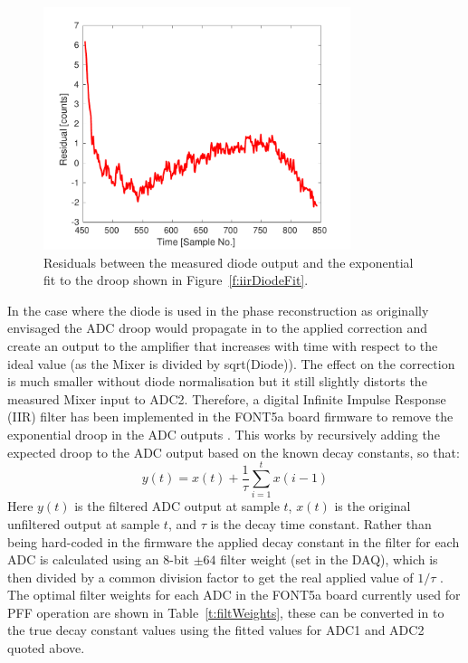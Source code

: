 \begin{figure}
  \centering
  \includegraphics[width=0.8\textwidth]{Figures/commissioning/iirDiodeFitResid}
  \caption{Residuals between the measured diode output and the exponential fit to the droop shown in Figure~\ref{f:iirDiodeFit}.}
  \label{f:iirDiodeFitResid}
\end{figure}

In the case where the diode is used in the phase reconstruction as originally envisaged the ADC droop would propagate in to the applied correction and create an output to the amplifier that increases with time with respect to the ideal value (as the Mixer is divided by sqrt(Diode)). The effect on the correction is much smaller without diode normalisation but it still slightly distorts the measured Mixer input to ADC2. Therefore, a digital Infinite Impulse Response (IIR) filter has been implemented in the FONT5a board firmware to remove the exponential droop in the ADC outputs \cite{glennCLIC14}. This works by recursively adding the expected droop to the ADC output based on the known decay constants, so that:
\begin{equation}
y(t) = x(t) + \frac{1}{\tau} \sum_{i=1}^{t} x(i-1)
\end{equation}
\label{e:iirFilt}
Here \(y(t)\) is the filtered ADC output at sample \(t\), \(x(t)\) is the original unfiltered output at sample \(t\), and \(\tau\) is the decay time constant. Rather than being hard-coded in the firmware the applied decay constant in the filter for each ADC is calculated using an 8-bit \(\pm64\) filter weight (set in the DAQ), which is then divided by a common division factor to get the real applied value of \(1/\tau\) \cite{glennPriv}. The optimal filter weights for each ADC in the FONT5a board currently used for PFF operation are shown in Table~\ref{t:filtWeights}, these can be converted in to the true decay constant values using the fitted values for ADC1 and ADC2 quoted above.

